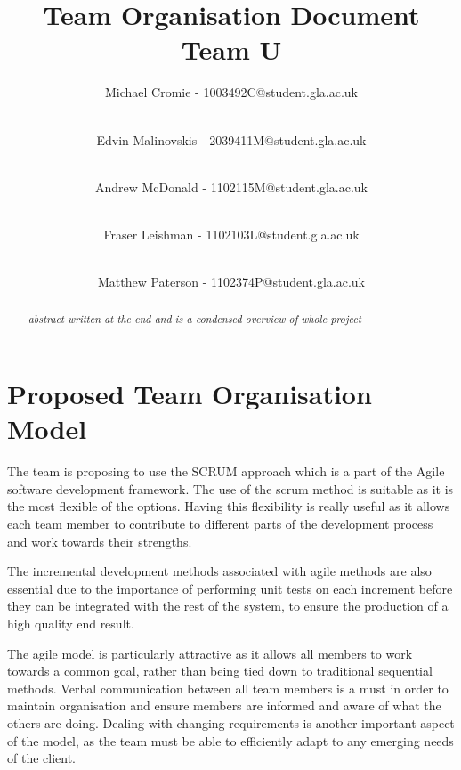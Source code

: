 \documentclass[preprint,12pt]{elsarticle}
\begin{document}
\begin{frontmatter}


\title{Team Organisation Document\\Team U}

\author{Michael Cromie - 1003492C@student.gla.ac.uk}
\author{\\ Edvin Malinovskis - 2039411M@student.gla.ac.uk}
\author{\\ Andrew McDonald - 1102115M@student.gla.ac.uk}
\author{\\ Fraser Leishman - 1102103L@student.gla.ac.uk}
\author{\\ Matthew Paterson - 1102374P@student.gla.ac.uk}





\begin{abstract}
\textit{abstract written at the end and is a condensed overview of whole project}
\end{abstract}



\end{frontmatter}


\section{Proposed Team Organisation Model}
\noindent The team is proposing to use the SCRUM approach which is a part of the Agile
software development framework.   The use of the scrum method is suitable as it
is the most flexible of the options. Having this flexibility is really useful
as it allows each team member to contribute to different parts of the
development process and work towards their strengths.


\noindent The incremental development methods associated with agile methods are also
essential due to the importance of performing unit tests on each increment
before they can be integrated with the rest of the system, to ensure the
production of a high quality end result.


\noindent The agile model is particularly attractive as it allows all members to work
towards a common goal, rather than being tied down to traditional sequential
methods. Verbal communication between all team members is a must in order to
maintain organisation and ensure members are informed and aware of what the
others are doing. Dealing with changing requirements is another important
aspect of the model, as the team must be able to efficiently adapt to any
emerging needs of the client. 
\end{document}
